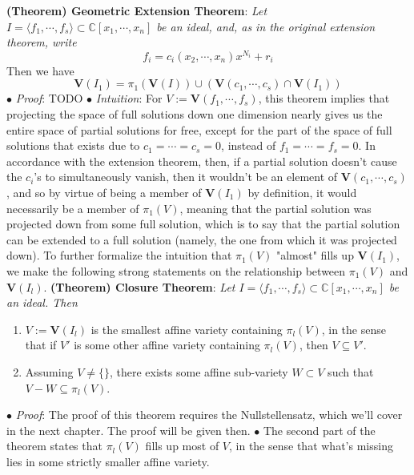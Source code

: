 \documentclass{article}
\begin{document}
\newline \newline
\textbf{(Theorem) Geometric Extension Theorem}: \textit{Let $ I = \langle f_1, \cdots, f_s \rangle \subset \mathbb{C}[x_1, \cdots, x_n] $ be an ideal, and, as in the original extension theorem, write}
$$ f_i = c_i(x_2, \cdots, x_n) x^{N_i} + r_i $$
\indent Then we have
$$ \mathbf{V}(I_1) = \pi_1(\mathbf{V}(I)) \cup \left( \mathbf{V}(c_1, \cdots, c_s) \cap \mathbf{V}(I_1) \right) $$
\indent $ \bullet $ \textit{Proof}: TODO
\newline
\indent $ \bullet $ \textit{Intuition}: For $ V := \mathbf{V}(f_1, \cdots, f_s) $, this theorem implies that projecting the space of full solutions down one dimension nearly gives us the entire space of partial solutions for free, except for the part of the space of full solutions that exists due to $ c_1 = \cdots = c_s = 0 $, instead of $ f_1 = \cdots = f_s = 0 $. In accordance with the extension theorem, then, if a partial solution doesn't cause the $ c_i $'s to simultaneously vanish, then it wouldn't be an element of $ \mathbf{V}(c_1, \cdots, c_s) $, and so by virtue of being a member of $ \mathbf{V}(I_1) $ by definition, it would necessarily be a member of $ \pi_1(V) $, meaning that the partial solution was projected down from some full solution, which is to say that the partial solution can be extended to a full solution (namely, the one from which it was projected down).
\newline \newline
To further formalize the intuition that $ \pi_1(V) $ "almost" fills up $ \mathbf{V}(I_1) $, we make the following strong statements on the relationship between $ \pi_1(V) $ and $ \mathbf{V}(I_l) $.
\newline \newline
\textbf{(Theorem) Closure Theorem}: \textit{Let $ I = \langle f_1, \cdots, f_s \rangle \subset \mathbb{C}[x_1, \cdots, x_n] $ be an ideal. Then}
\begin{enumerate}
	\item $ V := \mathbf{V}(I_l) $ is the smallest affine variety containing $ \pi_l(V) $, in the sense that if $ V' $ is some other affine variety containing $ \pi_l(V) $, then $ V \subseteq V' $.
	\item Assuming $ V \neq \{ \} $, there exists some affine sub-variety $ W \subset V $ such that $ V - W \subseteq \pi_l(V) $.
\end{enumerate}
\indent $ \bullet $ \textit{Proof}: The proof of this theorem requires the Nullstellensatz, which we'll cover in the next chapter. The proof will be given then.
\newline
\indent $ \bullet $ The second part of the theorem states that $ \pi_l(V) $ fills up most of $ V $, in the sense that what's missing lies in some strictly smaller affine variety.
\end{document}
